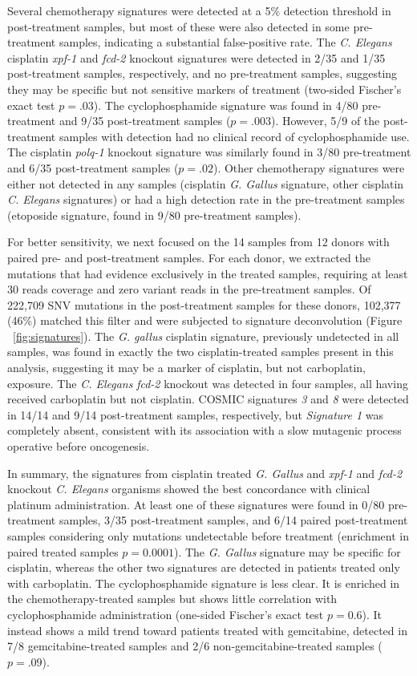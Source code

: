 Several chemotherapy signatures were detected at a 5\% detection threshold in post-treatment samples, but most of these were also detected in some pre-treatment samples, indicating a substantial false-positive rate. The \textit{C. Elegans} cisplatin \textit{xpf-1} and \textit{fcd-2} knockout signatures were detected in 2/35 and 1/35 post-treatment samples, respectively, and no pre-treatment samples, suggesting they may be specific but not sensitive markers of treatment (two-sided Fischer's exact test $p=.03$). The cyclophosphamide signature was found in 4/80 pre-treatment and 9/35 post-treatment samples ($p=.003$). However, 5/9 of the post-treatment samples with detection had no clinical record of cyclophosphamide use. The cisplatin \textit{polq-1} knockout signature was similarly found in 3/80 pre-treatment and 6/35 post-treatment samples ($p=.02$). Other chemotherapy signatures were either not detected in any samples (cisplatin \textit{G. Gallus} signature, other cisplatin \textit{C. Elegans} signatures) or had a high detection rate in the pre-treatment samples (etoposide signature, found in 9/80 pre-treatment samples).

For better sensitivity, we next focused on the 14 samples from 12 donors with paired pre- and post-treatment samples. For each donor, we extracted the mutations that had evidence exclusively in the treated samples, requiring at least 30 reads coverage and zero variant reads in the pre-treatment samples. Of 222,709 SNV mutations in the post-treatment samples for these donors, 102,377 (46\%) matched this filter and were subjected to signature deconvolution (Figure ~\ref{fig:signatures}). The \textit{G. gallus} cisplatin signature, previously undetected in all samples, was found in exactly the two cisplatin-treated samples present in this analysis, suggesting it may be a marker of cisplatin, but not carboplatin, exposure. The \textit{C. Elegans} \textit{fcd-2} knockout was detected in four samples, all having received carboplatin but not cisplatin. COSMIC signatures \textit{3} and \textit{8} were detected in 14/14 and 9/14 post-treatment samples, respectively, but \textit{Signature 1} was completely absent, consistent with its association with a slow mutagenic process operative before oncogenesis.

In summary, the signatures from cisplatin treated \textit{G. Gallus} and \textit{xpf-1} and \textit{fcd-2} knockout \textit{C. Elegans} organisms showed the best concordance with clinical platinum administration. At least one of these signatures were found in 0/80 pre-treatment samples, 3/35 post-treatment samples, and 6/14 paired post-treatment samples considering only mutations undetectable before treatment (enrichment in paired treated samples $p=0.0001$). The \textit{G. Gallus} signature may be specific for cisplatin, whereas the other two signatures are detected in patients treated only with carboplatin. The cyclophosphamide signature is less clear. It is enriched in the chemotherapy-treated samples but shows little correlation with cyclophosphamide administration (one-sided Fischer's exact test $p=0.6$). It instead shows a mild trend toward patients treated with gemcitabine, detected in 7/8 gemcitabine-treated samples and 2/6 non-gemcitabine-treated samples ($p=.09$).

